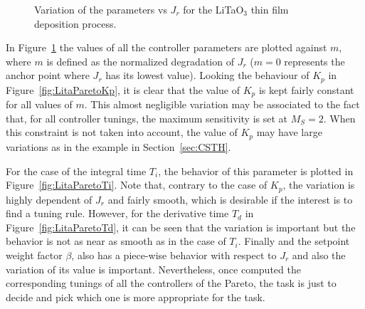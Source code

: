 \begin{figure}[tb]
{		
		\label{fig:LitaParetoBeta}	
	}
	\caption{Variation of the parameters vs $J_r$ for the  LiTaO$_3$ thin film deposition process.}
	\label{fig:LitaParetoParam}
\end{figure}
%

In Figure~\ref{fig:LitaParetoParam} the values of all the controller parameters are plotted against $m$, where $m$ is defined as the normalized degradation of $J_{r}$ ($m=0$ represents the anchor point where $J_r$ has its lowest value). Looking the behaviour of $K_p$ in Figure~\ref{fig:LitaParetoKp}, it is clear that the value of $K_p$ is kept fairly constant for all values of $m$. This almost negligible variation may be associated to the fact that, for all controller tunings, the maximum sensitivity is set at $M_S = 2$. When this constraint is not taken into account, the value of $K_p$ may have large variations as in the example in Section~\ref{sec:CSTH}.

For the case of the integral time $T_i$, the behavior of this parameter is plotted in Figure~\ref{fig:LitaParetoTi}. Note that, contrary to the case of $K_p$, the variation is highly dependent of $J_r$ and fairly smooth, which is desirable if the interest is to find a tuning rule. However, for the derivative time $T_d$ in Figure~\ref{fig:LitaParetoTd}, it can be seen that the variation is important but the behavior is not as near as smooth as in the case of $T_i$. Finally and the setpoint weight factor $\beta$, also has a piece-wise behavior with respect to $J_r$ and also the variation of its value is important. Nevertheless, once computed the corresponding tunings of all the controllers of the Pareto, the task is just to decide and pick which one is more appropriate for the task.

